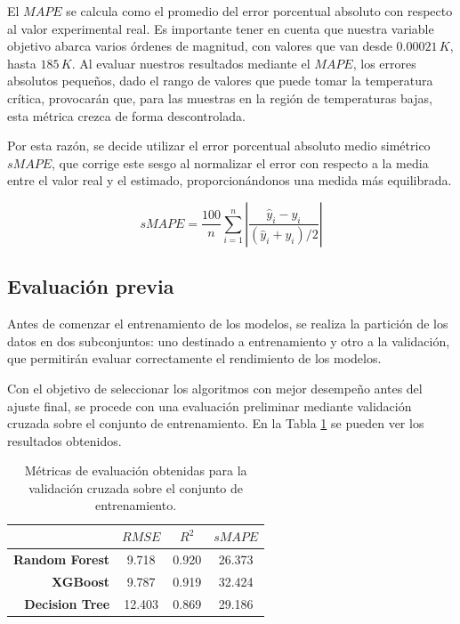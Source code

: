 \documentclass[titlepage, 11pt]{book}
\begin{document}
El $MAPE$ se calcula como el promedio del error porcentual absoluto con respecto al valor experimental real. Es importante tener en cuenta que nuestra variable objetivo abarca varios órdenes de magnitud, con valores que van desde $0.00021\,K$, hasta $185\,K$. Al evaluar nuestros resultados mediante el $MAPE$, los errores absolutos pequeños, dado el rango de valores que puede tomar la temperatura crítica, provocarán que, para las muestras en la región de temperaturas bajas, esta métrica crezca de forma descontrolada.

Por esta razón, se decide utilizar el error porcentual absoluto medio simétrico $sMAPE$, que corrige este sesgo al normalizar el error con respecto a la media entre el valor real y el estimado, proporcionándonos una medida más equilibrada.

\begin{equation*}
    sMAPE=\frac{100}{n} \sum_{i=1}^n \left|\frac{\hat{y}_i-y_i}{(\hat{y}_i+y_i)/2}\right|
\end{equation*}


\subsection{Evaluación previa}
Antes de comenzar el entrenamiento de los modelos, se realiza la partición de los datos en dos subconjuntos: uno destinado a entrenamiento y otro a la validación, que permitirán evaluar correctamente el rendimiento de los modelos.

Con el objetivo de seleccionar los algoritmos con mejor desempeño antes del ajuste final, se procede con una evaluación preliminar mediante validación cruzada sobre el conjunto de entrenamiento. En la Tabla \ref{tab:prev_crossval} se pueden ver los resultados obtenidos.

\begin{table}[H]
    \centering
    \caption{Métricas de evaluación obtenidas para la validación cruzada sobre el conjunto de entrenamiento.}
    \begin{tabular}{r|c|c|c}
                               & \textbf{$RMSE$} & \textbf{$R^2$} & \textbf{$sMAPE$} \\ \hline
        \textbf{Random Forest} & 9.718           & 0.920          & 26.373           \\ \hline
        \textbf{XGBoost}       & 9.787           & 0.919          & 32.424           \\ \hline
        \textbf{Decision Tree} & 12.403          & 0.869          & 29.186          
    \end{tabular}
    \label{tab:prev_crossval}
\end{table}
\end{document}
